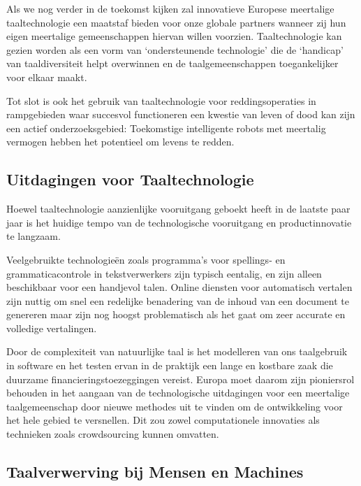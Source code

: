 \begin{multicols}{2}
Als we nog verder in de toekomst kijken zal innovatieve Europese meertalige taaltechnologie een maatstaf bieden voor onze globale partners wanneer zij hun eigen meertalige gemeenschappen hiervan willen voorzien. Taaltechnologie kan gezien worden als een vorm van `ondersteunende technologie' die de `handicap' van taaldiversiteit helpt overwinnen en de taalgemeenschappen toegankelijker voor elkaar maakt.

  Tot slot is ook het gebruik van taaltechnologie voor reddingsoperaties in rampgebieden waar succesvol functioneren een kwestie van leven of dood kan zijn een actief onderzoeksgebied: Toekomstige intelligente robots met meertalig vermogen hebben het potentieel om levens te redden.

\subsection{Uitdagingen voor Taaltechnologie}

Hoewel taaltechnologie aanzienlijke vooruitgang geboekt heeft in de laatste paar jaar is het huidige tempo van de technologische vooruitgang en productinnovatie te langzaam.


Veelgebruikte technologie{\"e}n zoals programma's voor spellings- en grammaticacontrole in tekstverwerkers zijn typisch eentalig, en zijn alleen beschikbaar voor een handjevol talen. Online diensten voor automatisch vertalen zijn nuttig om snel een redelijke benadering van de inhoud van een document te genereren maar zijn nog hoogst problematisch als het gaat om zeer accurate en volledige vertalingen.

Door de complexiteit van natuurlijke taal is het modelleren van ons taalgebruik in software en het testen ervan in de praktijk een lange en kostbare zaak die duurzame financieringstoezeggingen vereist. Europa moet daarom zijn pioniersrol behouden in het aangaan van de technologische uitdagingen voor een meertalige taalgemeenschap door nieuwe methodes uit te vinden om de ontwikkeling voor het hele gebied te versnellen. Dit zou zowel computationele innovaties als technieken zoals crowdsourcing kunnen omvatten.

\subsection{Taalverwerving bij Mensen en Machines}


\end{multicols}
